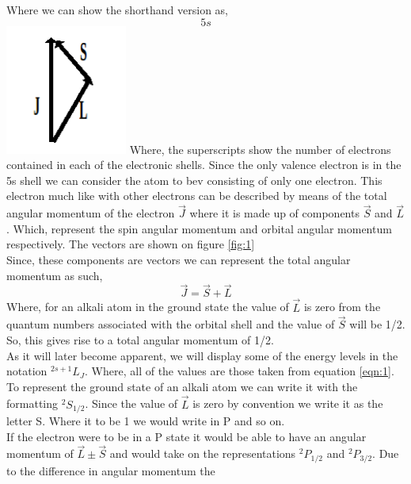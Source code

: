 \documentclass[twocolumn]{article}
\begin{document}
Where we can show the shorthand version as,
\begin{equation*}
[Kr]5s
\end{equation*}
\center
\includegraphics[width=0.3\linewidth]{pictures/electron-angular-momentum.png}
\label{fig:1}
\justify
Where, the superscripts show the number of electrons contained in each of the 
electronic shells. Since the only valence electron is in the 5s shell we can 
consider the atom to bev consisting of only one electron. This electron much 
like with other 
electrons can be described by means of the total angular momentum of the 
electron $\vec{J}$ where it is made up of components $\vec{S}$ and 
$\vec{L}$. Which, represent the spin angular momentum and orbital angular 
momentum respectively. The vectors are shown on figure \ref{fig:1}
\\
Since, these components are vectors we can represent the total angular momentum 
as such,
\begin{equation}
\vec{J} = \vec{S}+\vec{L}
\label{eqn:1}
\end{equation}
\justify
Where, for an alkali atom in the ground state the value of $\vec{L}$ is zero 
from the quantum numbers associated with the orbital shell and the value of 
$\vec{S}$ will be 1/2. So, this gives rise to a total angular momentum of 1/2.
\\
As it will later become apparent, we will display some of the energy levels in 
the notation $^{2s+1}L_J$. Where, all of the values are those taken from 
equation \ref{eqn:1}. To represent the ground state of an alkali atom we can 
write it with the formatting $^{2}S_{1/2}$. Since the value of $\vec{L}$ is 
zero by convention we write it as the letter S. Where it to be 1 we would write 
in P and so on.
\\
If the electron were to be in a P state it would be able to have an angular 
momentum of $\vec{L}\pm\vec{S}$ and would take on the representations 
$^{2}P_{1/2}$ and $^{2}P_{3/2}$. Due to the difference in angular momentum the 
\end{document}
